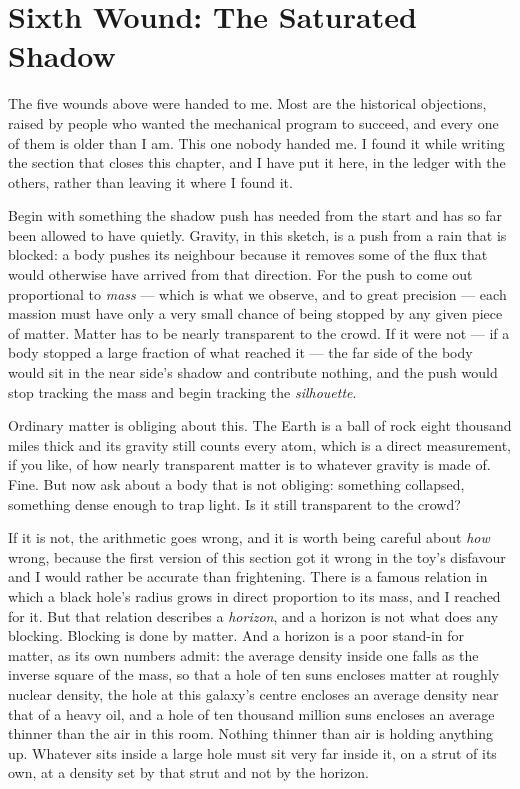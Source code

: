 \section{Sixth Wound: The Saturated Shadow}

The five wounds above were handed to me. Most are the historical objections, raised by people who wanted the mechanical program to succeed, and every one of them is older than I am. This one nobody handed me. I found it while writing the section that closes this chapter, and I have put it here, in the ledger with the others, rather than leaving it where I found it.

Begin with something the shadow push has needed from the start and has so far been allowed to have quietly. Gravity, in this sketch, is a push from a rain that is blocked: a body pushes its neighbour because it removes some of the flux that would otherwise have arrived from that direction. For the push to come out proportional to \emph{mass} --- which is what we observe, and to great precision --- each massion must have only a very small chance of being stopped by any given piece of matter. Matter has to be nearly transparent to the crowd. If it were not --- if a body stopped a large fraction of what reached it --- the far side of the body would sit in the near side's shadow and contribute nothing, and the push would stop tracking the mass and begin tracking the \emph{silhouette}.

Ordinary matter is obliging about this. The Earth is a ball of rock eight thousand miles thick and its gravity still counts every atom, which is a direct measurement, if you like, of how nearly transparent matter is to whatever gravity is made of. Fine. But now ask about a body that is not obliging: something collapsed, something dense enough to trap light. Is it still transparent to the crowd?

If it is not, the arithmetic goes wrong, and it is worth being careful about \emph{how} wrong, because the first version of this section got it wrong in the toy's disfavour and I would rather be accurate than frightening. There is a famous relation in which a black hole's radius grows in direct proportion to its mass, and I reached for it. But that relation describes a \emph{horizon}, and a horizon is not what does any blocking. Blocking is done by matter. And a horizon is a poor stand-in for matter, as its own numbers admit: the average density inside one falls as the inverse square of the mass, so that a hole of ten suns encloses matter at roughly nuclear density, the hole at this galaxy's centre encloses an average density near that of a heavy oil, and a hole of ten thousand million suns encloses an average thinner than the air in this room. Nothing thinner than air is holding anything up. Whatever sits inside a large hole must sit very far inside it, on a strut of its own, at a density set by that strut and not by the horizon.

